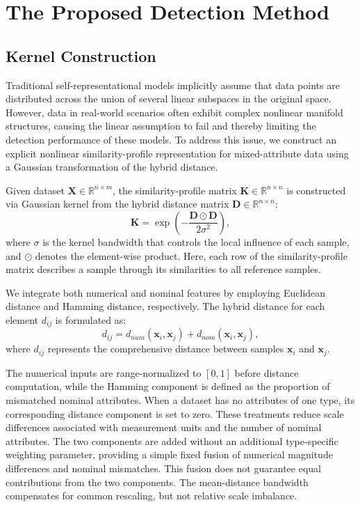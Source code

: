 \documentclass[ASNA,twocolumn]{USG} %
\begin{document}
\section{The Proposed Detection Method}

\subsection{Kernel Construction}

Traditional self-representational models implicitly assume that data points are distributed across the union of several linear subspaces in the original space. However, data in real-world scenarios often exhibit complex nonlinear manifold structures, causing the linear assumption to fail and thereby limiting the detection performance of these models. To address this issue, we construct an explicit nonlinear similarity-profile representation for mixed-attribute data using a Gaussian transformation of the hybrid distance.

Given dataset $\boldsymbol{X} \in \mathbb{R}^{n \times m}$, the similarity-profile matrix $\boldsymbol{K} \in \mathbb{R}^{n \times n}$ is constructed via Gaussian kernel from the hybrid distance matrix $\boldsymbol{D} \in \mathbb{R}^{n \times n}$:
\begin{equation}\label{kernel_matrix}
\boldsymbol{K} = \exp \left( -\frac{\boldsymbol{D} \odot \boldsymbol{D}}{2\sigma^2} \right),
\end{equation}
where $\sigma$ is the kernel bandwidth that controls the local influence of each sample, and $\odot$ denotes the element-wise product. Here, each row of the similarity-profile matrix describes a sample through its similarities to all reference samples.

We integrate both numerical and nominal features by employing Euclidean distance and Hamming distance, respectively. The hybrid distance for each element $d_{ij}$ is formulated as:
\begin{equation}
d_{i j} = d_{num}(\boldsymbol{x}_{i}, \boldsymbol{x}_{j}) + d_{nom}(\boldsymbol{x}_{i}, \boldsymbol{x}_{j}),
\end{equation}
where $d_{ij}$ represents the comprehensive distance between samples $\boldsymbol{x}_i$ and $\boldsymbol{x}_j$.

The numerical inputs are range-normalized to $[0,1]$ before distance computation, while the Hamming component is defined as the proportion of mismatched nominal attributes. When a dataset has no attributes of one type, its corresponding distance component is set to zero. These treatments reduce scale differences associated with measurement units and the number of nominal attributes. The two components are added without an additional type-specific weighting parameter, providing a simple fixed fusion of numerical magnitude differences and nominal mismatches. This fusion does not guarantee equal contributions from the two components. The mean-distance bandwidth compensates for common rescaling, but not relative scale imbalance.
\end{document}
